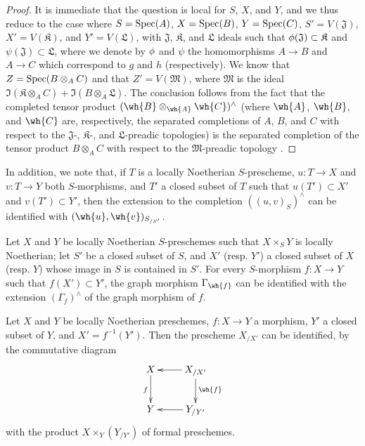 \begin{proof}
\label{proof-1.10.9.7}
It is immediate that the question is local for $S$, $X$, and $Y$, and we thus reduce to the case where $S=\operatorname{Spec}(A)$, $X=\operatorname{Spec}(B)$, $Y=\operatorname{Spec}(C)$, $S'=V(\mathfrak{J})$, $X'=V(\mathfrak{K})$, and $Y'=V(\mathfrak{L})$, with $\mathfrak{J}$, $\mathfrak{K}$, and $\mathfrak{L}$ ideals such that $\phi(\mathfrak{J})\subset\mathfrak{K}$ and $\psi(\mathfrak{J})\subset\mathfrak{L}$, where we denote by $\phi$ and $\psi$ the homomorphisms $A\to B$ and $A\to C$ which correspond to $g$ and $h$ (respectively).
We know that $Z=\operatorname{Spec}(B\otimes_A C)$ and that $Z'=V(\mathfrak{M})$, where $\mathfrak{M}$ is the ideal $\Im(\mathfrak{K}\otimes_A C)+\Im(B\otimes_A\mathfrak{L})$.
The conclusion follows  from the fact that the completed tensor product $(\wh{B}\otimes_\wh{A}\wh{C})^\wedge$ (where $\wh{A}$, $\wh{B}$, and $\wh{C}$ are, respectively, the separated completions of $A$, $B$, and $C$ with respect to the $\mathfrak{J}$-, $\mathfrak{K}$-, and $\mathfrak{L}$-preadic topologies) is the separated completion of the tensor product $B\otimes_A C$ with respect to the $\mathfrak{M}$-preadic topology .
\end{proof}

In addition, we note that, if $T$ is a locally Noetherian $S$-prescheme, $u:T\to X$ and $v:T\to Y$ both $S$-morphisms, and $T'$ a closed subset of $T$ such that $u(T')\subset X'$ and $v(T')\subset Y'$, then the extension to the completion $((u,v)_S)^\wedge$ can be identified with $(\wh{u},\wh{v})_{S_{/S'}}$.

\begin{cor}[10.9.8]
\label{1.10.9.8}
Let $X$ and $Y$ be locally Noetherian $S$-preschemes such that $X\times_S Y$ is locally Noetherian; let $S'$ be a closed subset of $S$, and $X'$ (resp. $Y'$) a closed subset of $X$ (resp. $Y$) whose image in $S$ is contained in $S'$.
For every $S$-morphism $f:X\to Y$ such that $f(X')\subset Y'$, the graph morphism $\Gamma_\wh{f}$ can be identified with the extension $(\Gamma_f)^\wedge$ of the graph morphism of $f$.
\end{cor}

\begin{cor}[10.9.9]
\label{1.10.9.9}
Let $X$ and $Y$ be locally Noetherian preschemes, $f:X\to Y$ a morphism, $Y'$ a closed subset of $Y$, and $X'=f^{-1}(Y')$.
Then the prescheme $X_{/X'}$ can be identified, by the commutative diagram
\[
  \xymatrix{
    X\ar[d]_f &
    X_{/X'}\ar[l]\ar[d]^{\wh{f}}\\
    Y &
    Y_{/Y'}\ar[l]
  }
\]
with the product $X\times_Y(Y_{/Y'})$ of formal preschemes.
\end{cor}

